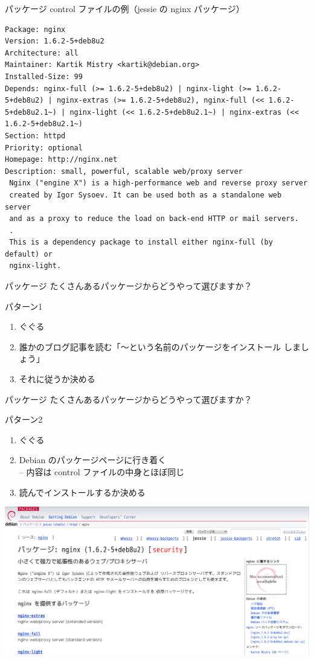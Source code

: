   \begin{frame}[containsverbatim]{パッケージ}
control ファイルの例（jessie の nginx パッケージ）

\scriptsize
\begin{verbatim}
Package: nginx
Version: 1.6.2-5+deb8u2
Architecture: all
Maintainer: Kartik Mistry <kartik@debian.org>
Installed-Size: 99
Depends: nginx-full (>= 1.6.2-5+deb8u2) | nginx-light (>= 1.6.2-5+deb8u2) | nginx-extras (>= 1.6.2-5+deb8u2), nginx-full (<< 1.6.2-5+deb8u2.1~) | nginx-light (<< 1.6.2-5+deb8u2.1~) | nginx-extras (<< 1.6.2-5+deb8u2.1~)
Section: httpd
Priority: optional
Homepage: http://nginx.net
Description: small, powerful, scalable web/proxy server
 Nginx ("engine X") is a high-performance web and reverse proxy server
 created by Igor Sysoev. It can be used both as a standalone web server
 and as a proxy to reduce the load on back-end HTTP or mail servers.
 .
 This is a dependency package to install either nginx-full (by default) or
 nginx-light.
\end{verbatim}
  \end{frame}

  \begin{frame}{パッケージ}
   たくさんあるパッケージからどうやって選びますか？\pause

   パターン1
   \begin{enumerate}
    \item ぐぐる\pause
    \item 誰かのブログ記事を読む「〜という名前のパッケージをインストール
	  しましょう」
    \item それに従うか決める
   \end{enumerate}
  \end{frame}
        
  \begin{frame}{パッケージ}
   たくさんあるパッケージからどうやって選びますか？\pause

   パターン2
   \begin{enumerate}
    \item ぐぐる\pause
    \item Debian のパッケージページに行き着く\\
	  -- 内容は control ファイルの中身とほぼ同じ
    \item 読んでインストールするか決める
   \end{enumerate}

   \begin{center} 
  \includegraphics[width=0.9\hsize]{image201606/pdo.png}
   \end{center}
  \end{frame}
        

